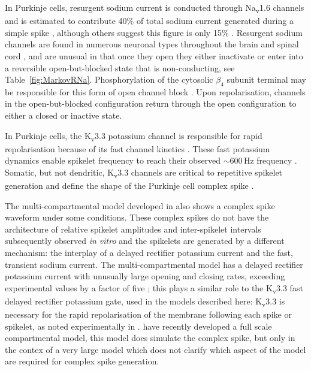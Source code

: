 \documentclass[twocolumn]{svjour3}          %
\newcommand{\hz}{\,\mathrm{Hz}}
\begin{document}
In Purkinje cells, resurgent sodium current is conducted through
Na\textsubscript{v}1.6 channels \citep{RamanBean1997} and is estimated
to contribute 40\% of total sodium current generated during a simple
spike \citep{RamanBean2001}, although others suggest this figure is
only 15\% \citep{LevinEtAl2006}. Resurgent sodium channels are found in
numerous neuronal types throughout the brain and spinal cord
\citep{OsorioEtAl2010}, and are unusual in that once they open they
either inactivate or enter into a reversible open-but-blocked state
that is non-conducting, see Table~\ref{fig:MarkovRNa}. Phosphorylation
of the cytosolic $\beta_4$ subunit terminal may be responsible for
this form of open channel block \citep{GriecoEtAl2002}. Upon
repolarisation, channels in the open-but-blocked configuration return
through the open configuration to either a closed or inactive state.

In Purkinje cells, the K\textsubscript{v}3.3 potassium channel is
responsible for rapid repolarisation \citep{VeysEtAl2013} because of
its fast channel kinetics
\citep{RudyEtAl1999,RudyMcBain2001}. These fast potassium dynamics
enable spikelet frequency to reach their observed $\sim 600\hz$
frequency \citep{WarnaarEtAl2015,BurroughsEtAl2016}. Somatic, but not
dendritic, K\textsubscript{v}3.3 channels are critical to repetitive
spikelet generation and define the shape of the Purkinje cell complex
spike \citep{HurlockEtAl2008,ZaghaEtAl2008,VeysEtAl2013}.

The multi-compartmental model developed in
\citet{DeSchutterBower1994a,DeSchutterBower1994b,DeSchutterBower1994c}
also shows a complex spike waveform under some conditions. These
complex spikes do not have the architecture of relative spikelet
amplitudes and inter-spikelet intervals subsequently observed
\textit{in vitro} and the spikelets are generated by a different
mechanism: the interplay of a delayed rectifier potassium current and
the fast, transient sodium current. The multi-compartmental model has
a delayed rectifier potassium current with unusually large opening and
closing rates, exceeding experimental values by a factor of five
\citep{YamadaEtAl1989}; this plays a similar role to the
K\textsubscript{v}3.3 fast delayed rectifier potassium gate,
\citep{VeysEtAl2013,ZaghaEtAl2008} used in the models described here:
K\textsubscript{v}3.3 is necessary for the rapid repolarisation of the
membrane following each spike or spikelet, as noted experimentally in
\citet{ZaghaEtAl2008,VeysEtAl2013}. \citet{ZangEtAl2018} have recently
developed a full scale compartmental model, this model does simulate
the complex spike, but only in the contex of a very large model which
does not clarify which aspect of the model are required for complex
spike generation.
\end{document}

